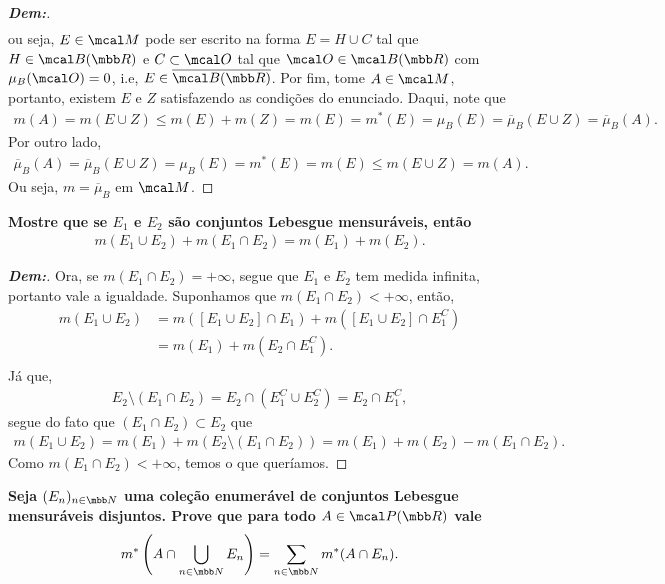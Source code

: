 {\begin{enumerate}[label=(\alph*), wide, labelindent=0pt]
\begin{proof}[\textbf{Dem:}]
\begin{align*}
      \end{align*}
      ou seja, $E\in \mcal M$ pode ser escrito na forma $E = H \cup C$ tal que $H \in \mcal B(\mbb R)$
      e $C\subset \mcal O$ tal que $\mcal O \in \mcal B(\mbb R)$ com $\mu_B(\mcal O) = 0$, i.e, 
      $E \in \overline{\mcal B(\mbb R)}$. Por fim, tome $A \in \mcal M$, portanto, existem 
      $E$ e $Z$ satisfazendo as condições do enunciado. Daqui, note que
      \begin{align*}
        m(A) = m(E\cup Z) \le m(E) + m(Z) = m(E) = m^*(E) = \mu_B(E) = \overline\mu_B(E\cup Z) = \overline\mu_B(A).
      \end{align*}
      Por outro lado, 
      \begin{align*}
        \overline\mu_B(A) = \overline\mu_B(E\cup Z) = \mu_B(E) = m^*(E) = m(E) \le m(E\cup Z) = m(A).
      \end{align*} 
      Ou seja, $m = \overline \mu_B$ em $\mcal M$.
    \end{proof}
\end{enumerate}}
\biglinend
\newpage
{}
\myexe{\thedois}
\bigline 
\textbf{Mostre que se $E_1$ e $E_2$ são conjuntos Lebesgue mensuráveis, então 
\begin{align*}
  m(E_1 \cup E_2) + m(E_1 \cap E_2) = m(E_1) + m(E_2).
\end{align*}}
\begin{proof}[\textbf{Dem:}] Ora, se $m(E_1 \cap E_2) = +\infty$, segue que $E_1$ 
  e $E_2$ tem medida infinita, portanto vale a igualdade. Suponhamos que $m(E_1 \cap E_2)<+\infty$,
  então, 
  \begin{align*}
    m(E_1\cup E_2) &= m([E_1 \cup E_2]\cap E_1) + m([E_1 \cup E_2]\cap E_1^C)\\
    &= m(E_1) + m(E_2 \cap E_1^C).\\
  \end{align*}
  Já que, 
  \begin{align*}
    E_2 \setminus (E_1 \cap E_2) = E_2 \cap (E_1^C \cup E_2^C) = E_2\cap E_1^C,
  \end{align*}
  segue do fato que $(E_1 \cap E_2) \subset E_2$ que
  \begin{align*}
    m(E_1 \cup E_2) = m(E_1) + m(E_2 \setminus(E_1 \cap E_2)) = m(E_1) + m(E_2) - m(E_1 \cap E_2).
  \end{align*}
  Como $m(E_1 \cap E_2)<+\infty$, temos o que queríamos.
\end{proof}
\biglinend
\newpage
{}
\myexe{\thedois}
\bigline 
\textbf{Seja $(E_n)_{n \in \mbb N}$ uma coleção enumerável de conjuntos Lebesgue mensuráveis disjuntos. Prove 
que para todo $A \in \mcal P(\mbb R)$ vale
\begin{align*}
  m^*\left(A \cap \bigcup\limits_{n \in \mbb N} E_n\right) = \sum_{n \in \mbb N}m^*(A\cap E_n).
\end{align*}}
